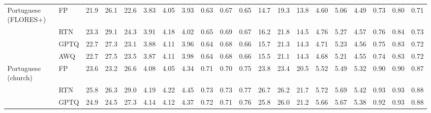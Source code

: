 \begin{landscape}
\begin{longtable}{llrrrrrrrrrrrrrrrrrr}
\midrule
Portuguese (FLORES+) & FP & 21.9 & 26.1 & 22.6 & 3.83 & 4.05 & 3.93 & 0.63 & 0.67 & 0.65 & 14.7 & 19.3 & 13.8 & 4.60 & 5.06 & 4.49 & 0.73 & 0.80 & 0.71 \\
 & RTN & \cellcolor{loss!2}23.3 & \cellcolor{loss!3}29.1 & \cellcolor{loss!2}24.3 & \cellcolor{loss!7}3.91 & \cellcolor{loss!12}4.18 & \cellcolor{loss!8}4.02 & \cellcolor{loss!10}0.65 & \cellcolor{loss!10}0.69 & \cellcolor{loss!10}0.67 & \cellcolor{loss!0}16.2 & \cellcolor{loss!1}21.8 & \cellcolor{loss!0}14.5 & \cellcolor{loss!3}4.76 & \cellcolor{loss!4}5.27 & \cellcolor{loss!1}4.57 & \cellcolor{loss!7}0.76 & \cellcolor{loss!9}0.84 & \cellcolor{loss!5}0.73 \\
 & GPTQ & \cellcolor{loss!1}22.7 & \cellcolor{loss!1}27.3 & \cellcolor{loss!1}23.1 & \cellcolor{loss!4}3.88 & \cellcolor{loss!5}4.11 & \cellcolor{loss!3}3.96 & \cellcolor{loss!5}0.64 & \cellcolor{loss!5}0.68 & \cellcolor{loss!5}0.66 & \cellcolor{loss!0}15.7 & \cellcolor{loss!1}21.3 & \cellcolor{loss!0}14.3 & \cellcolor{loss!2}4.71 & \cellcolor{loss!3}5.23 & \cellcolor{loss!1}4.56 & \cellcolor{loss!5}0.75 & \cellcolor{loss!7}0.83 & \cellcolor{loss!2}0.72 \\
 & AWQ & \cellcolor{loss!1}22.7 & \cellcolor{loss!2}27.5 & \cellcolor{loss!1}23.5 & \cellcolor{loss!4}3.87 & \cellcolor{loss!6}4.11 & \cellcolor{loss!5}3.98 & \cellcolor{loss!5}0.64 & \cellcolor{loss!5}0.68 & \cellcolor{loss!5}0.66 & \cellcolor{loss!0}15.5 & \cellcolor{loss!1}21.1 & \cellcolor{loss!0}14.3 & \cellcolor{loss!1}4.68 & \cellcolor{loss!3}5.21 & \cellcolor{loss!1}4.55 & \cellcolor{loss!2}0.74 & \cellcolor{loss!7}0.83 & \cellcolor{loss!2}0.72 \\
\midrule
Portuguese (church) & FP & 23.6 & 23.2 & 26.6 & 4.08 & 4.05 & 4.34 & 0.71 & 0.70 & 0.75 & 23.8 & 23.4 & 20.5 & 5.52 & 5.49 & 5.32 & 0.90 & 0.90 & 0.87 \\
 & RTN & \cellcolor{loss!2}25.8 & \cellcolor{loss!3}26.3 & \cellcolor{loss!3}29.0 & \cellcolor{loss!10}4.19 & \cellcolor{loss!15}4.22 & \cellcolor{loss!10}4.45 & \cellcolor{loss!10}0.73 & \cellcolor{loss!15}0.73 & \cellcolor{loss!10}0.77 & \cellcolor{loss!1}26.7 & \cellcolor{loss!1}26.2 & \cellcolor{loss!0}21.7 & \cellcolor{loss!3}5.72 & \cellcolor{loss!3}5.69 & \cellcolor{loss!2}5.42 & \cellcolor{loss!7}0.93 & \cellcolor{loss!7}0.93 & \cellcolor{loss!2}0.88 \\
 & GPTQ & \cellcolor{loss!1}24.9 & \cellcolor{loss!1}24.5 & \cellcolor{loss!1}27.3 & \cellcolor{loss!5}4.14 & \cellcolor{loss!7}4.12 & \cellcolor{loss!3}4.37 & \cellcolor{loss!5}0.72 & \cellcolor{loss!6}0.71 & \cellcolor{loss!5}0.76 & \cellcolor{loss!1}25.8 & \cellcolor{loss!1}26.0 & \cellcolor{loss!0}21.2 & \cellcolor{loss!2}5.66 & \cellcolor{loss!3}5.67 & \cellcolor{loss!1}5.38 & \cellcolor{loss!6}0.92 & \cellcolor{loss!6}0.93 & \cellcolor{loss!2}0.88 \\

\end{longtable}
\end{landscape}
